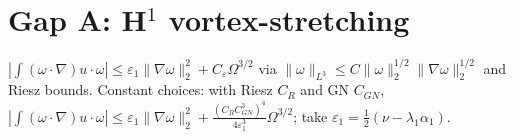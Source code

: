 \section{Gap A: H$^1$ vortex-stretching}\label{app:gapA}
$|\int (\omega\cdot\nabla)u \cdot \omega| \le \varepsilon_1 \|\nabla\omega\|_2^2 + C_\varepsilon \Omega^{3/2}$ via $\|\omega\|_{L^3}\le C \|\omega\|_2^{1/2}\|\nabla\omega\|_2^{1/2}$ and Riesz bounds.
Constant choices: with Riesz $C_R$ and GN $C_{GN}$, 
$|\int (\omega\cdot\nabla)u \cdot \omega| \le \varepsilon_1 \|\nabla\omega\|_2^2 + \frac{(C_R C_{GN}^3)^4}{4\varepsilon_1^3}\Omega^{3/2}$; take $\varepsilon_1=\tfrac12(\nu-\lambda_1\alpha_1)$.
